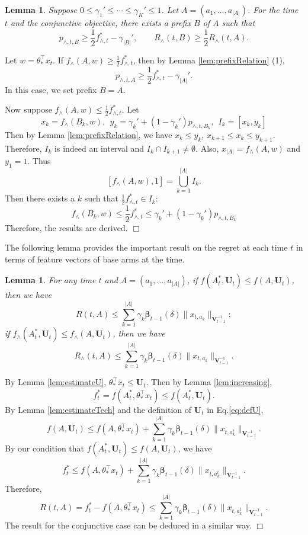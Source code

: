 \documentclass{article}
\newcommand{\bbeta}{\boldsymbol{\beta}}
\newcommand{\bU}{\mathbf{U}}
\newcommand{\bV}{\mathbf{V}}
\newcommand{\abs}[1]{\left| #1 \right|}
\newcommand{\norm}[1]{\| #1 \|}
\newtheorem{lemma}[theorem]{Lemma}%
\newenvironment{proof}{\noindent {\textbf{Proof. }}}{$\Box$ \medskip}
\begin{document}
\begin{lemma} \label{lem:prefixexists}
Suppose $0 \leq \gamma_1' \leq \cdots \leq \gamma_K' \leq 1$. Let $A = (a_1, ..., a_{\abs{A}})$. For the time $t$ and the conjunctive objective, there exists a prefix $B$ of $A$ such that 
$$
p_{\wedge, t, B} \geq \frac{1}{2}f_{\wedge, t}^{\ast} - \gamma_{\abs{B}}', \qquad R_{\wedge}(t, B) \geq \frac{1}{2} R_{\wedge}(t, A).
$$ 
\end{lemma}
\begin{proof}
Let $w= \theta_*^{\top} x_t$.
If $f_{\wedge}(A, w) \geq \frac{1}{2} f_{\wedge, t}^{\ast}$, then by Lemma \ref{lem:prefixRelation} (1),
$$
p_{\wedge, t, A} \geq \frac{1}{2}f_{\wedge, t}^{\ast} - \gamma_{\abs{A}}'.
$$
In this case, we set prefix $B = A$.

Now suppose $f_{\wedge}(A, w) \leq \frac{1}{2} f_{\wedge, t}^{\ast}$. Let
$$
x_k = f_{\wedge}(B_k,w), ~~ y_k = \gamma_k' + (1 - \gamma_k')p_{\wedge, t,B_k}, ~~I_k = [x_k, y_k]
$$
Then by Lemma \ref{lem:prefixRelation}, we have $x_k \leq y_k$, $x_{k+1} \leq x_k \leq y_{k+1}$. Therefore, $I_k$ is indeed an interval and $I_k \cap I_{k+1} \neq \emptyset$. Also, $x_{\abs{A}} = f_{\wedge}(A, w)$ and $y_1 = 1$. Thus
$$
[f_{\wedge}(A,w), 1] = \bigcup_{k=1}^{\abs{A}} I_k.
$$
Then there exists a $k$ such that $\frac{1}{2}f_{\wedge, t}^{\ast} \in I_k$:
$$
f_{\wedge}(B_k,w) \leq \frac{1}{2}f_{\wedge, t}^{\ast} \leq \gamma_k' + (1 - \gamma_k')p_{\wedge, t, B_k}
$$
Therefore, the results are derived.
\end{proof}

The following lemma provides the important result on the regret at each time $t$ in terms of feature vectors of base arms at the time.
\begin{lemma}
\label{lem:DeltaEstimate}
For any time $t$ and $A = (a_1, \ldots, a_{\abs{A}})$, if $f(A_t^*, \bU_t) \leq f(A, \bU_t)$, then we have
$$
R(t,A) \leq \sum_{k=1}^{\abs{A}} \gamma_k \bbeta_{t-1}(\delta)\norm{x_{t,a_k}}_{\bV_{t-1}^{-1}};
$$
if $f_{\wedge}(A_t^*, \bU_t) \leq f_{\wedge}(A, \bU_t)$, then we have
$$
R_{\wedge}(t, A) \leq \sum_{k=1}^{\abs{A}} \gamma_k \bbeta_{t-1}(\delta)\norm{x_{t,a_k}}_{\bV_{t-1}^{-1}}.
$$
\end{lemma}
\begin{proof}
By Lemma \ref{lem:estimateU}, $\theta_{\ast}^{\top}x_t \leq \bU_t$. Then by Lemma \ref{lem:increasing},
$$
f_t^{\ast} = f(A_t^{\ast}, \theta_{\ast}^{\top}x_t) \leq f(A_t^{\ast}, \bU_t).
$$
By Lemma \ref{lem:estimateTech} and the definition of $\bU_t$ in Eq.\eqref{eq:defU},
$$
f(A, \bU_t) \leq f(A, \theta_{\ast}^{\top}x_t) + \sum_{k=1}^{\abs{A}} \gamma_k \bbeta_{t-1}(\delta)\norm{x_{t, a_k^t}}_{\bV_{t-1}^{-1}}.
$$
By our condition that $f(A_t^{\ast}, \bU_t) \leq f(A, \bU_t)$, we have 
$$
f_t^{\ast} \leq f(A, \theta_{\ast}^{\top}x_t) + \sum_{k=1}^{\abs{A}} \gamma_k \bbeta_{t-1}(\delta)\norm{x_{t, a_k^t}}_{\bV_{t-1}^{-1}}.
$$
Therefore,
$$
R(t, A) = f_t^{\ast} - f(A, \theta_{\ast}^{\top}x_t) \leq \sum_{k=1}^{\abs{A}} \gamma_k \bbeta_{t-1}(\delta)\norm{x_{t, a_k^t}}_{\bV_{t-1}^{-1}}.
$$
The result for the conjunctive case can be deduced in a similar way.
\end{proof}
\end{document}
